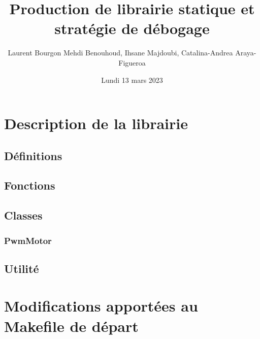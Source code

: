 \documentclass[11pt]{article}
\author{Laurent Bourgon Mehdi Benouhoud, Ihsane Majdoubi, Catalina-Andrea Araya-Figueroa}
\title{Production de librairie statique et stratégie de débogage}
\date{Lundi 13 mars 2023}
\begin{document}
\maketitle
\newpage


\section{Description de la librairie}
\subsection{Définitions}
\subsection{Fonctions}
\subsection{Classes}
\subsubsection{PwmMotor}
\subsection{Utilité}


\section{Modifications apportées au Makefile de départ}
\end{document}
